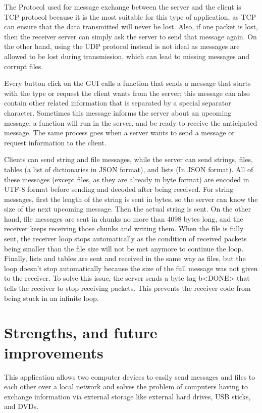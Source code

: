 \documentclass{article}
\begin{document}
The Protocol used for message exchange between the server and the client is TCP protocol because it is the most suitable for this type of application, as TCP can ensure that the data transmitted will never be lost. Also, if one packet is lost, then the receiver server can simply ask the server to send that message again. On the other hand, using the UDP protocol instead is not ideal as messages are allowed to be lost during transmission, which can lead to missing messages and corrupt files.

Every button click on the GUI calls a function that sends a message that starts with the type or request the client wants from the server; this message can also contain other related information that is separated by a special separator character. Sometimes this message informs the server about an upcoming message, a function will run in the server, and be ready to receive the anticipated message. The same process goes when a server wants to send a message or request information to the client.

Clients can send string and file messages, while the server can send strings, files, tables (a list of dictionaries in JSON format), and lists (In JSON format). All of these messages (except files, as they are already in byte format) are encoded in UTF-8 format before sending and decoded after being received. For string messages, first the length of the string is sent in bytes, so the server can know the size of the next upcoming message. Then the actual string is sent. On the other hand, file messages are sent in chunks no more than 4098 bytes long, and the receiver keeps receiving those chunks and writing them. When the file is fully sent, the receiver loop stops automatically as the condition of received packets being smaller than the file size will not be met anymore to continue the loop. Finally, lists and tables are sent and received in the same way as files, but the loop doesn't stop automatically because the size of the full message was not given to the receiver. To solve this issue, the server sends a byte tag b<DONE> that tells the receiver to stop receiving packets. This prevents the receiver code from being stuck in an infinite loop.

\section{Strengths, and future improvements}

This application allows two computer devices to easily send messages and files to each other over a local network and solves the problem of computers having to exchange information via external storage like external hard drives, USB sticks, and DVDs.
\end{document}
